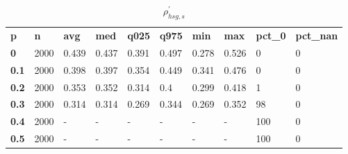 \begin{table}[h]
 \centering 
\footnotesize
\caption{$\rho_{hsg,s}^\prime $}
\label{tab:alphahsgs}
\begin{tabular}[h]{| l l l l l l l l l l|
    } \hline
\textbf{ p} & \textbf{ n} & \textbf{ avg} & \textbf{ med} & \textbf{ q025} & \textbf{ q975} & \textbf{ min} & \textbf{ max} & \textbf{ pct\_0} & \textbf{ pct\_nan}
           \\
  \textbf{  0} & 2000 & 0.439 & 0.437 & 0.391 & 0.497 & 0.278 & 0.526 &   0 & 0
           \\
  \textbf{0.1} & 2000 & 0.398 & 0.397 & 0.354 & 0.449 & 0.341 & 0.476 &   0 & 0
           \\
  \textbf{0.2} & 2000 & 0.353 & 0.352 & 0.314 &   0.4 & 0.299 & 0.418 &   1 & 0
           \\
  \textbf{0.3} & 2000 & 0.314 & 0.314 & 0.269 & 0.344 & 0.269 & 0.352 &  98 & 0
           \\
  \textbf{0.4} & 2000 & - & - & - & - & - & - & 100 & 0
           \\
  \textbf{0.5} & 2000 & - & - & - & - & - & - & 100 & 0
           \\
 \hline \end{tabular}
 \end{table}
